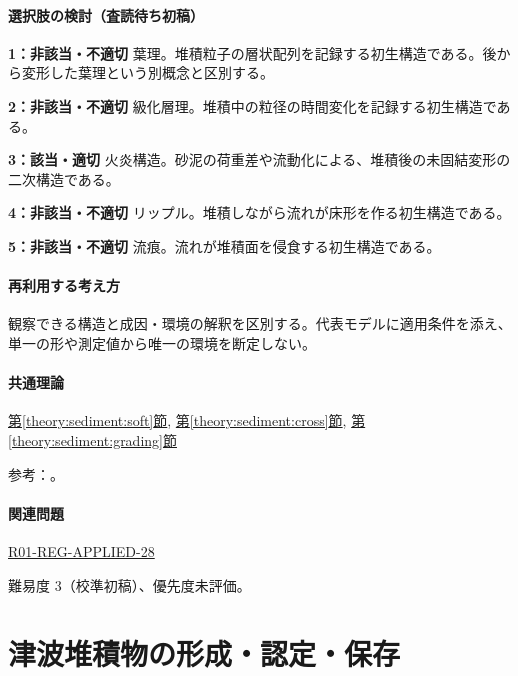 \paragraph{選択肢の検討（査読待ち初稿）}\mbox{}\par

\noindent\textbf{1：非該当・不適切} 葉理。堆積粒子の層状配列を記録する初生構造である。後から変形した葉理という別概念と区別する。\par

\noindent\textbf{2：非該当・不適切} 級化層理。堆積中の粒径の時間変化を記録する初生構造である。\par

\noindent\textbf{3：該当・適切} 火炎構造。砂泥の荷重差や流動化による、堆積後の未固結変形の二次構造である。\par

\noindent\textbf{4：非該当・不適切} リップル。堆積しながら流れが床形を作る初生構造である。\par

\noindent\textbf{5：非該当・不適切} 流痕。流れが堆積面を侵食する初生構造である。\par

\paragraph{再利用する考え方} 観察できる構造と成因・環境の解釈を区別する。代表モデルに適用条件を添え、単一の形や測定値から唯一の環境を断定しない。

\paragraph{共通理論} \hyperref[theory:sediment:soft]{第\ref*{theory:sediment:soft}節}, \hyperref[theory:sediment:cross]{第\ref*{theory:sediment:cross}節}, \hyperref[theory:sediment:grading]{第\ref*{theory:sediment:grading}節}

\par 参考：\cite{sed_soft_deformation,sed_houston_structures}。

\paragraph{関連問題} \hyperref[q:r01-reg-applied-28]{R01-REG-APPLIED-28}

\par 難易度 3（校準初稿）、優先度未評価。

\section{津波堆積物の形成・認定・保存}

